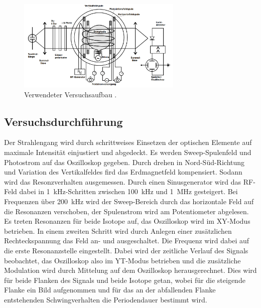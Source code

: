\begin{figure}[H]
  \centering
  \includegraphics[width=0.7\textwidth]{content/pics/Aufbau.png}
  \caption{Verwendeter Versuchsaufbau \cite{anleitung}.}
  \label{Dur:Abb1}
\end{figure}

\subsection{Versuchsdurchführung}
Der Strahlengang wird durch schrittweises Einsetzen der optischen Elemente auf
maximale Intensität einjustiert und abgedeckt.
Es werden Sweep-Spulenfeld und Photostrom auf das Oszilloskop gegeben.
Durch drehen in Nord-Süd-Richtung und Variation des Vertikalfeldes fird das Erdmagnetfeld
kompensiert.
Sodann wird das Resonzverhalten ausgemessen.
Durch einen Sinusgenerator wird das RF-Feld dabei in \SI{1}{\kilo\hertz}-Schritten
zwischen \SI{100}{\kilo\hertz} und \SI{1}{\mega\hertz} gesteigert.
Bei Frequenzen über \SI{200}{\kilo\hertz} wird der Sweep-Bereich durch das horizontale
Feld auf die Resonanzen verschoben, der Spulenstrom wird am Potentiometer abgelesen.
Es treten Resonanzen für beide Isotope auf, das Oszilloskop wird im XY-Modus
betrieben.
In einem zweiten Schritt wird durch Anlegen einer zusätzlichen Rechteckspannung
das Feld an- und ausgeschaltet.
Die Frequenz wird dabei auf die erste Resonanzstelle eingestellt.
Dabei wird der zeitliche Verlauf des Signals beobachtet, das Oszilloskop also
im YT-Modus betrieben und die zusätzliche Modulation wird durch Mittelung
auf dem Oszilloskop herausgerechnet.
Dies wird für beide Flanken des Signals und beide Isotope getan, wobei für die
steigende Flanke ein Bild aufgenommen und für das an der abfallenden Flanke
entstehenden Schwingverhalten die Periodendauer bestimmt wird.
